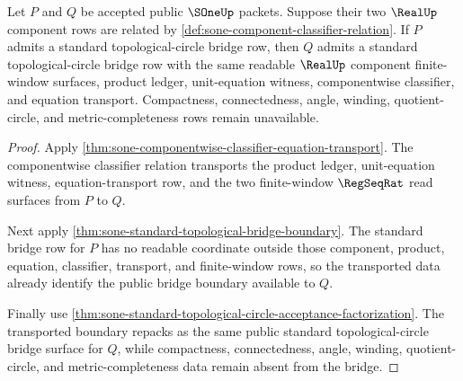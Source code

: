 \begin{theorem}
\label{thm:sone-standard-bridge-componentwise-transport-stability}
Let $P$ and $Q$ be accepted public $\SOneUp$ packets. Suppose their two
$\RealUp$ component rows are related by
\autoref{def:sone-component-classifier-relation}. If $P$ admits a standard
topological-circle bridge row, then $Q$ admits a standard topological-circle
bridge row with the same readable $\RealUp$ component finite-window surfaces,
product ledger, unit-equation witness, componentwise classifier, and equation
transport. Compactness, connectedness, angle, winding, quotient-circle, and
metric-completeness rows remain unavailable.
\end{theorem}
\begin{proof}
Apply \autoref{thm:sone-componentwise-classifier-equation-transport}. The
componentwise classifier relation transports the product ledger,
unit-equation witness, equation-transport row, and the two finite-window
$\RegSeqRat$ read surfaces from $P$ to $Q$.

Next apply \autoref{thm:sone-standard-topological-bridge-boundary}. The
standard bridge row for $P$ has no readable coordinate outside those
component, product, equation, classifier, transport, and finite-window rows, so
the transported data already identify the public bridge boundary available to
$Q$.

Finally use
\autoref{thm:sone-standard-topological-circle-acceptance-factorization}. The
transported boundary repacks as the same public standard topological-circle
bridge surface for $Q$, while compactness, connectedness, angle, winding,
quotient-circle, and metric-completeness data remain absent from the bridge.
\end{proof}

